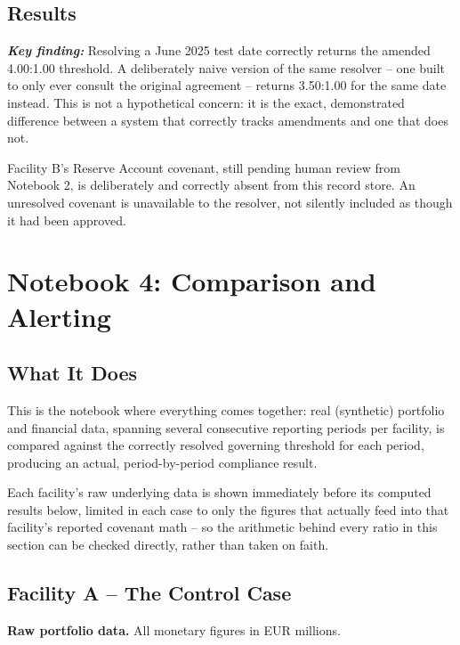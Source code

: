 \documentclass[11pt,a4paper]{article}
\newcommand{\keyfinding}[1]{%
  \begin{tcolorbox}[colback=white, colframe=black, boxrule=0.6pt, arc=1pt, left=8pt, right=8pt, top=6pt, bottom=6pt]
  \textbf{\textit{Key finding:}} #1
  \end{tcolorbox}
}
\begin{document}
\subsection{Results}

\keyfinding{Resolving a June 2025 test date correctly returns the amended 4.00:1.00 threshold. A deliberately naive version of the same resolver -- one built to only ever consult the original agreement -- returns 3.50:1.00 for the same date instead. This is not a hypothetical concern: it is the exact, demonstrated difference between a system that correctly tracks amendments and one that does not.}

Facility B's Reserve Account covenant, still pending human review from Notebook 2, is deliberately and correctly absent from this record store. An unresolved covenant is unavailable to the resolver, not silently included as though it had been approved.

\newpage
\section{Notebook 4: Comparison and Alerting}

\subsection{What It Does}

This is the notebook where everything comes together: real (synthetic) portfolio and financial data, spanning several consecutive reporting periods per facility, is compared against the correctly resolved governing threshold for each period, producing an actual, period-by-period compliance result.

Each facility's raw underlying data is shown immediately before its computed results below, limited in each case to only the figures that actually feed into that facility's reported covenant math -- so the arithmetic behind every ratio in this section can be checked directly, rather than taken on faith.

\subsection{Facility A -- The Control Case}

\textbf{Raw portfolio data.} All monetary figures in EUR millions.
\end{document}
